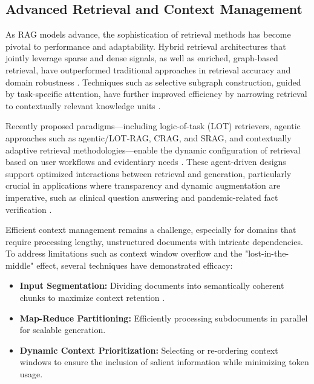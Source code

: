 \documentclass[sigconf]{acmart}
\begin{document}
\subsection{Advanced Retrieval and Context Management}

As RAG models advance, the sophistication of retrieval methods has become pivotal to performance and adaptability. Hybrid retrieval architectures that jointly leverage sparse and dense signals, as well as enriched, graph-based retrieval, have outperformed traditional approaches in retrieval accuracy and domain robustness \cite{ref3, ref8, ref10, ref12, ref29, ref31, ref37, ref47, ref48, ref52, ref54}. Techniques such as selective subgraph construction, guided by task-specific attention, have further improved efficiency by narrowing retrieval to contextually relevant knowledge units \cite{ref48, ref52}.

Recently proposed paradigms—including logic-of-task (LOT) retrievers, agentic approaches such as agentic/LOT-RAG, CRAG, and SRAG, and contextually adaptive retrieval methodologies—enable the dynamic configuration of retrieval based on user workflows and evidentiary needs \cite{ref54, ref64}. These agent-driven designs support optimized interactions between retrieval and generation, particularly crucial in applications where transparency and dynamic augmentation are imperative, such as clinical question answering and pandemic-related fact verification \cite{ref54, ref64}.

Efficient context management remains a challenge, especially for domains that require processing lengthy, unstructured documents with intricate dependencies. To address limitations such as context window overflow and the "lost-in-the-middle" effect, several techniques have demonstrated efficacy:

\begin{itemize}
    \item \textbf{Input Segmentation:} Dividing documents into semantically coherent chunks to maximize context retention \cite{ref5, ref10, ref15, ref16, ref43, ref49, ref52, ref54, ref55}.
    \item \textbf{Map-Reduce Partitioning:} Efficiently processing subdocuments in parallel for scalable generation.
    \item \textbf{Dynamic Context Prioritization:} Selecting or re-ordering context windows to ensure the inclusion of salient information while minimizing token usage.
\end{itemize}
\end{document}
